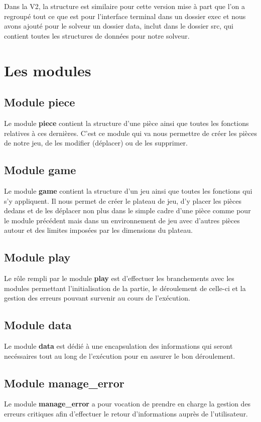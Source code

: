 \documentclass{report}
\begin{document}
Dans la V2, la structure est similaire pour cette version mise à part que l'on a regroupé tout ce que est pour l'interface terminal dans un dossier exec et nous avons ajouté pour le solveur un dossier data, inclut dans le dossier src, qui contient toutes les structures de données pour notre solveur.

\section{Les modules}
\subsection*{Module piece}
Le module \textbf{piece} contient la structure d'une pièce ainsi que toutes les fonctions relatives à ces dernières. C'est ce module qui va nous permettre de créer les pièces de notre jeu, de les modifier (déplacer) ou de les supprimer.
\subsection*{Module game}
Le module \textbf{game} contient la structure d'un jeu ainsi que toutes les fonctions qui s'y appliquent. Il nous permet de créer le plateau de jeu, d'y placer les pièces dedans et de les déplacer non plus dans le simple cadre d'une pièce comme pour le module précédent mais dans un environnement de jeu avec d'autres pièces autour et des limites imposées par les dimensions du plateau.
\subsection*{Module play}
Le rôle rempli par le module \textbf{play} est d'effectuer les branchements avec les modules permettant l'initialisation de la partie, le déroulement de celle-ci et la gestion des erreurs pouvant survenir au cours de l'exécution.
\subsection*{Module data}
Le module \textbf{data} est dédié à une encapsulation des informations qui seront necéssaires tout au long de l'exécution pour en assurer le bon déroulement.
\subsection*{Module manage\_error}
Le module \textbf{manage\_error} a pour vocation de prendre en charge la gestion des erreurs critiques afin d'effectuer le retour d'informations auprès de l'utilisateur.
\end{document}
